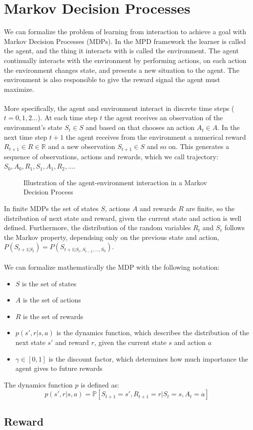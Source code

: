 \section{Markov Decision Processes}

We can formalize the problem of learning from interaction to achieve a goal with Markov Decision Processes (MDPs). In the MPD framework the learner is called the agent, and the thing it interacts with is called the environment. The agent continually interacts with the environment by performing actions, on each action the environment changes state, and presents a new situation to the agent. The environment is also responsible to give the reward signal the agent must maximize.\\\\
More specifically, the agent and environment interact in discrete time steps ($t=0, 1, 2 \dots$). At each time step $t$ the agent receives an observation of the environment's state $S_t \in S$ and based on that chooses an action $A_t \in A$. In the next time step $t+1$ the agent receives from the environment a numerical reward $R_{t+1} \in R \in \mathbb{R}$ and a new observation $S_{t+1} \in S$ and so on. This generates a sequence of observations, actions and rewards, which we call trajectory: $S_0, A_0, R_1, S_1, A_1, R_2, \dots$.
\begin{figure}[H]
    \centering
    
    \caption{Illustration of the agent-environment interaction in a Markov Decision Process}
    \label{fig:mdp}
\end{figure}
\clearpage
In finite MDPs the set of states $S$, actions $A$ and rewards $R$ are finite, so the distribution of next state and reward, given the current state and action is well defined. Furthermore, the distribution of the random variables $R_t$ and $S_t$ follows the Markov property, dependsing only on the previous state and action, $P(S_{t+1|S_t}) = P(S_{t+1|S_t, S_{t-1}, \dots, S_0})$.\\\\
We can formalize mathematically the MDP with the following notation:
\begin{itemize}
    \item $S$ is the set of states
    \item $A$ is the set of actions
    \item $R$ is the set of rewards
    \item $p(s', r | s, a)$ is the dynamics function, which describes the distribution of the next state $s'$ and reward $r$, given the current state $s$ and action $a$
    \item $\gamma \in [0, 1]$ is the discount factor, which determines how much importance the agent gives to future rewards
\end{itemize}
The dynamics function $p$ is defined as:
\begin{equation}
    p(s', r | s, a) = \mathbb{P}[S_{t+1} = s', R_{t+1} = r | S_t = s, A_t = a]
    \label{dynamics-function}
\end{equation}

\subsection{Reward}


